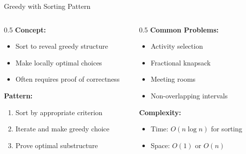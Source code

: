 \documentclass[aspectratio=169,xcolor=dvipsnames]{beamer}
\begin{document}
\begin{frame}{Greedy with Sorting Pattern}
  \begin{columns}
    \begin{column}{0.5\textwidth}
      \textbf{Concept:}
      \begin{itemize}
        \item Sort to reveal greedy structure
        \item Make locally optimal choices
        \item Often requires proof of correctness
      \end{itemize}

      \vspace{0.3cm}
      \textbf{Pattern:}
      \begin{enumerate}
        \item Sort by appropriate criterion
        \item Iterate and make greedy choice
        \item Prove optimal substructure
      \end{enumerate}
    \end{column}

    \begin{column}{0.5\textwidth}
      \textbf{Common Problems:}
      \begin{itemize}
        \item Activity selection
        \item Fractional knapsack
        \item Meeting rooms
        \item Non-overlapping intervals
      \end{itemize}

      \vspace{0.3cm}
      \textbf{Complexity:}
      \begin{itemize}
        \item Time: $O(n \log n)$ for sorting
        \item Space: $O(1)$ or $O(n)$
      \end{itemize}
    \end{column}
  \end{columns}
\end{frame}
\end{document}
